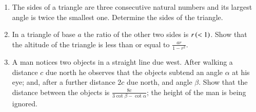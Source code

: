\documentclass[journal]{IEEEtran}
\begin{document}
\begin{enumerate}
\hfill{}

\item The sides of a triangle are three consecutive natural numbers and its largest angle is twice the smallest one. Determine the sides of the triangle.

\hfill{}

\item In a triangle of base $a$ the ratio of the other two sides is $r\left(<1\right)$. Show that the altitude of the triangle is less than or equal to $\frac{ar}{1-r^2}$.

\hfill{}

\item A man notices two objects in a straight line due west. After walking a distance $c$ due north he observes that the objects subtend an angle $\alpha$ at his eye; and, after a further distance $2c$ due north, and angle $\beta$. Show that the distance between the objects is $\frac{8c}{3\cot{\beta}-\cot{\alpha}}$; the height of the man is being ignored. 

\hfill{}

\end{enumerate}
\end{document}
